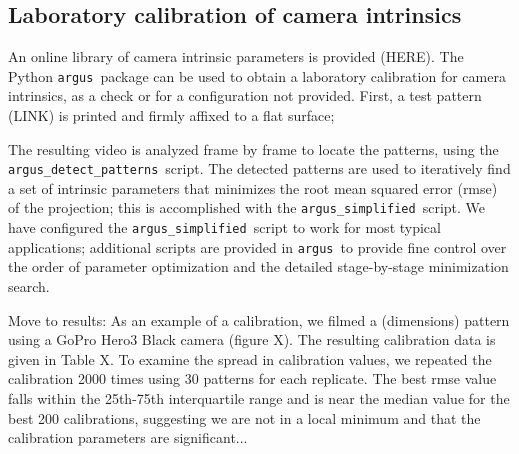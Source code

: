 \documentclass[fleqn,10pt]{wlpeerj}
\newcommand{\argus}{\texttt{argus}}
\newcommand{\detectpatterns}{\texttt{argus\_detect\_patterns}}
\newcommand{\simplified}{\texttt{argus\_simplified}}
\begin{document}
\subsection*{Laboratory calibration of camera intrinsics}
An online library of camera intrinsic parameters is provided (HERE).  The Python \argus\ package can be used to obtain a laboratory calibration for camera intrinsics, as a check or for a configuration not provided. First, a test pattern (LINK) is printed and firmly affixed to a flat surface;   


The resulting video is analyzed frame by frame to locate the patterns, using the \detectpatterns\ script.  The detected patterns are used to iteratively find a set of intrinsic parameters that minimizes the root mean squared error (rmse) of the projection; this is accomplished with the \simplified\ script.  We have configured the \simplified\ script to work for most typical applications; additional scripts are provided in \argus\ to provide fine control over the order of parameter optimization and the detailed stage-by-stage minimization search.

Move to results: As an example of a calibration, we filmed a (dimensions) pattern using a GoPro Hero3 Black camera (figure X).  The resulting calibration data is given in Table X. To examine the spread in calibration values, we repeated the calibration 2000 times using 30 patterns for each replicate. The best rmse value falls within the 25th-75th interquartile range and is near the median value for the best 200 calibrations, suggesting we are not in a local minimum and that the calibration parameters are significant...   
\end{document}
